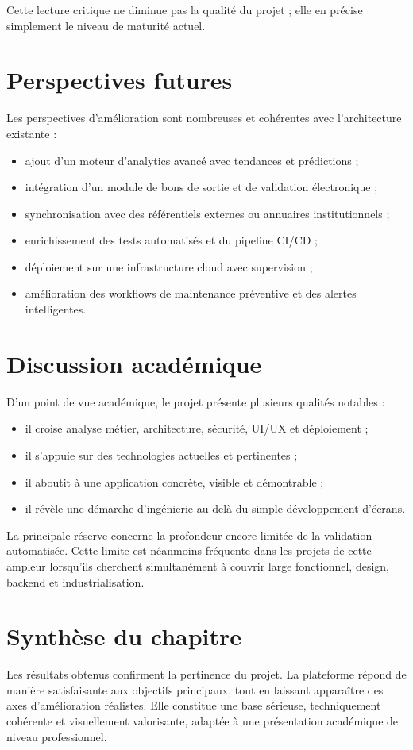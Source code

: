 ﻿\documentclass[12pt,a4paper,oneside]{report}
\begin{document}
Cette lecture critique ne diminue pas la qualité du projet ; elle en précise simplement le niveau de maturité actuel.

\section{Perspectives futures}
Les perspectives d'amélioration sont nombreuses et cohérentes avec l'architecture existante :
\begin{itemize}
  \item ajout d'un moteur d'analytics avancé avec tendances et prédictions ;
  \item intégration d'un module de bons de sortie et de validation électronique ;
  \item synchronisation avec des référentiels externes ou annuaires institutionnels ;
  \item enrichissement des tests automatisés et du pipeline CI/CD ;
  \item déploiement sur une infrastructure cloud avec supervision ;
  \item amélioration des workflows de maintenance préventive et des alertes intelligentes.
\end{itemize}

\section{Discussion académique}
D'un point de vue académique, le projet présente plusieurs qualités notables :
\begin{itemize}
  \item il croise analyse métier, architecture, sécurité, UI/UX et déploiement ;
  \item il s'appuie sur des technologies actuelles et pertinentes ;
  \item il aboutit à une application concrète, visible et démontrable ;
  \item il révèle une démarche d'ingénierie au-delà du simple développement d'écrans.
\end{itemize}

La principale réserve concerne la profondeur encore limitée de la validation automatisée. Cette limite est néanmoins fréquente dans les projets de cette ampleur lorsqu'ils cherchent simultanément à couvrir large fonctionnel, design, backend et industrialisation.

\section{Synthèse du chapitre}
Les résultats obtenus confirment la pertinence du projet. La plateforme répond de manière satisfaisante aux objectifs principaux, tout en laissant apparaître des axes d'amélioration réalistes. Elle constitue une base sérieuse, techniquement cohérente et visuellement valorisante, adaptée à une présentation académique de niveau professionnel.
\end{document}
